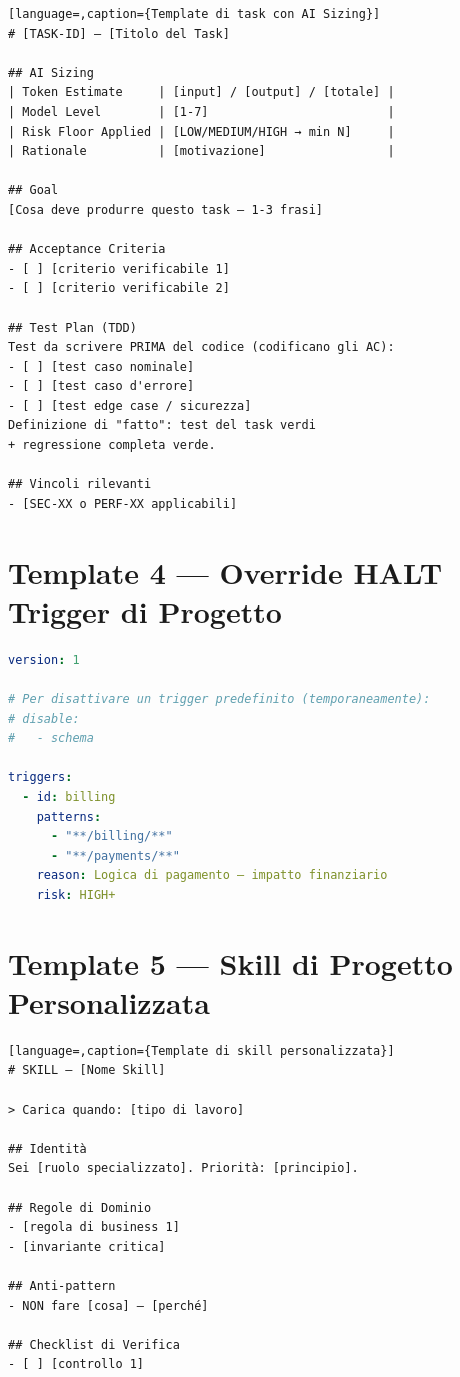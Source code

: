 \begin{lstlisting}[language=,caption={Template di task con AI Sizing}]
# [TASK-ID] — [Titolo del Task]

## AI Sizing
| Token Estimate     | [input] / [output] / [totale] |
| Model Level        | [1-7]                         |
| Risk Floor Applied | [LOW/MEDIUM/HIGH → min N]     |
| Rationale          | [motivazione]                 |

## Goal
[Cosa deve produrre questo task — 1-3 frasi]

## Acceptance Criteria
- [ ] [criterio verificabile 1]
- [ ] [criterio verificabile 2]

## Test Plan (TDD)
Test da scrivere PRIMA del codice (codificano gli AC):
- [ ] [test caso nominale]
- [ ] [test caso d'errore]
- [ ] [test edge case / sicurezza]
Definizione di "fatto": test del task verdi
+ regressione completa verde.

## Vincoli rilevanti
- [SEC-XX o PERF-XX applicabili]
\end{lstlisting}

\section*{Template 4 --- Override HALT Trigger di Progetto}

\begin{lstlisting}[language=yaml,caption={Override di progetto per halt-triggers.yaml}]
version: 1

# Per disattivare un trigger predefinito (temporaneamente):
# disable:
#   - schema

triggers:
  - id: billing
    patterns:
      - "**/billing/**"
      - "**/payments/**"
    reason: Logica di pagamento — impatto finanziario
    risk: HIGH+
\end{lstlisting}

\section*{Template 5 --- Skill di Progetto Personalizzata}

\begin{lstlisting}[language=,caption={Template di skill personalizzata}]
# SKILL — [Nome Skill]

> Carica quando: [tipo di lavoro]

## Identità
Sei [ruolo specializzato]. Priorità: [principio].

## Regole di Dominio
- [regola di business 1]
- [invariante critica]

## Anti-pattern
- NON fare [cosa] — [perché]

## Checklist di Verifica
- [ ] [controllo 1]
\end{lstlisting}

